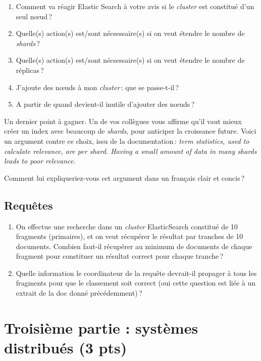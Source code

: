 \documentclass[11pt,a4paper]{article}
\begin{document}
\begin{enumerate}
       \item Comment va réagir Elastic Search à votre avis si le \textit{cluster} est constitué d'un seul n{\oe}ud\,?
       \item Quelle(s) action(s) est/sont nécsessaire(s) si on veut étendre le nombre de \textit{shards}\,?
       \item Quelle(s) action(s) est/sont nécsessaire(s)  si on veut étendre le nombre de réplicas\,?
       \item J'ajoute des n{\oe}uds à mon \textit{cluster}\,: que se passe-t-il\,?
       \item A partir de quand devient-il inutile d'ajouter des n{\oe}uds\,?
\end{enumerate}

Un dernier point à gagner. Un de vos collègues vous affirme qu'il vaut mieux
créer un index avec beaucoup de \textit{shards}, pour anticiper la croissance future. Voici
un argument contre ce choix, issu de la documentation\,:
\textit{term statistics, used to calculate relevance, are per shard. Having a small amount of 
data in many shards leads to poor relevance.} 

Comment lui expliqueriez-vous cet argument dans un français clair et concis\,?

\subsection*{Requêtes}

\begin{enumerate}

  \item On effectue une recherche dans un \textit{cluster} ElasticSearch constitué de 10 fragments (primaires), et on veut récupérer
      le résultat par tranches de 10 documents. Combien faut-il récupérer au minimum de documents de chaque 
      fragment pour constituer un résultat correct pour chaque tranche\,? 

  \item Quelle information le coordinateur de la requête
    devrait-il propager à tous les fragments pour que le classement soit correct (oui cette question est liée
    à un extrait de la doc donné précédemment)\,? 

 \end{enumerate}


\section*{Troisième partie : systèmes distribués (3 pts)}
\end{document}
